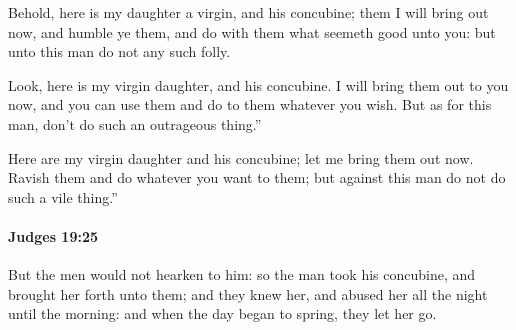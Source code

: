 			\begin{versebox}
					\item[BHS] 
					\item[ASV] Behold, here is my daughter a virgin, and his concubine; them I will bring out now, and humble ye them, and do with them what seemeth good unto you: but unto this man do not any such folly.
					\item[NIV] Look, here is my virgin daughter, and his concubine. I will bring them out to you now, and you can use them and do to them whatever you wish. But as for this man, don’t do such an outrageous thing.”
					\item[NRSV] Here are my virgin daughter and his concubine; let me bring them out now. Ravish them and do whatever you want to them; but against this man do not do such a vile thing.”
			\end{versebox}

		\paragraph{Judges 19:25} %
			\label{JUDGES-19-25}

			But the men would not hearken to him: so the man took his concubine, and brought her forth unto them; and they knew her, and abused her all the night until the morning: and when the day began to spring, they let her go.


